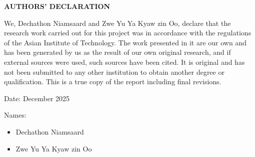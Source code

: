 \begin{center}
    \large{\bf AUTHORS' DECLARATION}
\end{center}

We, Dechathon Niamsaard and Zwe Yu Ya Kyaw zin Oo, declare that the research work carried out for this project was in accordance with the regulations of the Asian Institute of Technology. The work presented in it are our own and has been generated by us as the result of our own original research, and if external sources were used, such sources have been cited. It is original and has not been submitted to any other institution to obtain another degree or qualification. This is a true copy of the report including final revisions.

Date: December 2025

Names: 
\begin{itemize}
    \item Dechathon Niamsaard
    \item Zwe Yu Ya Kyaw zin Oo
\end{itemize}

\vspace{2em}
